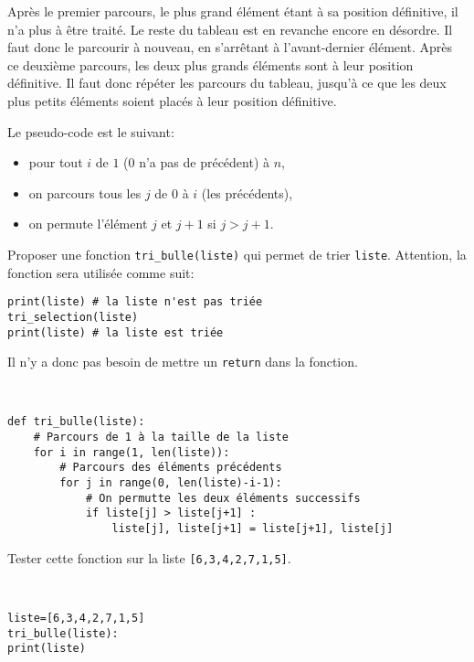 Après le premier parcours, le plus grand élément étant à sa position définitive, il n'a plus à être traité. Le reste du tableau est en revanche encore en désordre. Il faut donc le parcourir à nouveau, en s'arrêtant à l'avant-dernier élément. Après ce deuxième parcours, les deux plus grands éléments sont à leur position définitive. Il faut donc répéter les parcours du tableau, jusqu'à ce que les deux plus petits éléments soient placés à leur position définitive.

Le pseudo-code est le suivant:
\begin{itemize}
 \item pour tout $i$ de $1$ ($0$ n'a pas de précédent) à $n$,
 \item on parcours tous les $j$ de $0$ à $i$ (les précédents),
 \item on permute l'élément $j$ et $j+1$ si $j>j+1$.
\end{itemize}

\begin{exercice}
Proposer une fonction \verb?tri_bulle(liste)? qui permet de trier \verb?liste?. Attention, la fonction sera utilisée comme suit:
\begin{verbatim}
print(liste) # la liste n'est pas triée
tri_selection(liste)
print(liste) # la liste est triée
\end{verbatim}

Il n'y a donc pas besoin de mettre un \verb?return? dans la fonction.
\end{exercice}

\begin{solution}~\\
\vspace{-0.7cm}
\begin{verbatim}
def tri_bulle(liste):
    # Parcours de 1 à la taille de la liste
    for i in range(1, len(liste)):
        # Parcours des éléments précédents
        for j in range(0, len(liste)-i-1):
            # On permutte les deux éléments successifs
            if liste[j] > liste[j+1] :
                liste[j], liste[j+1] = liste[j+1], liste[j]
\end{verbatim}    
\end{solution}

\begin{exercice}
Tester cette fonction sur la liste \verb?[6,3,4,2,7,1,5]?.
\end{exercice}

\begin{solution}~\\
\vspace{-0.7cm}
\begin{verbatim}
liste=[6,3,4,2,7,1,5]
tri_bulle(liste): 
print(liste)
\end{verbatim}    
\end{solution}

